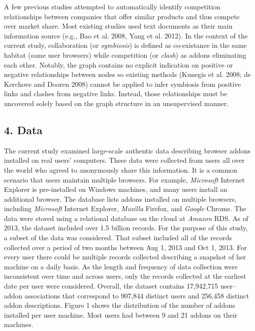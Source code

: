 \documentclass{article} %
\begin{document}
A few previous studies attempted to automatically identify competition relationships between companies that offer similar products and thus compete over market share. Most existing studies used text documents as their main information source (e.g., Bao et al. 2008, Yang et al. 2012). In the context of the current study, collaboration (or \textit{symbiosis}) is defined as co-existance in the same habitat (same user browsers) while competition (or \textit{clash}) as addons eliminating each other. Notably, the graph contains no explicit indication on positive or negative relationships between nodes so existing methods (Kunegis et al. 2008; de Kerchove and Dooren 2008) cannot be applied to infer symbiosis from positive links and clashes from negative links. Instead, those relationships must be uncovered solely based on the graph structure in an unsupervised manner.




\subsection{4.  Data}

 

The current study examined large-scale authentic data describing browser addons installed on real users' computers. These data were collected from users all over the world who agreed to anonymously share this information. It is a common scenario that users maintain multiple browsers. For example, \textit{Microsoft} Internet Explorer is pre-installed on Windows machines, and many users install an additional browser. The database lists addons installed on multiple browsers, including \textit{Microsoft} Internet Explorer, \textit{Mozilla }Firefox, and \textit{Google }Chrome. The data were stored using a relational database on the cloud at \textit{Amazon} RDS. As of 2013, the dataset included over 1.5 billion records. For the purpose of this study, a subset of the data was considered. That subset included all of the records collected over a period of two months between Aug 1, 2013 and Oct 1, 2013. For every user there could be multiple records collected describing a snapshot of her machine on a daily basis. As the length and frequency of data collection were inconsistent over time and across users, only the records collected at the earliest date per user were considered. Overall, the dataset contains 17,942,715 user--addon associations that correspond to 907,844 distinct users and 256,458 distinct addon descriptions. Figure 1 shows the distribution of the number of addons installed per user machine. Most users had between 9 and 21 addons on their machines.
\end{document}
